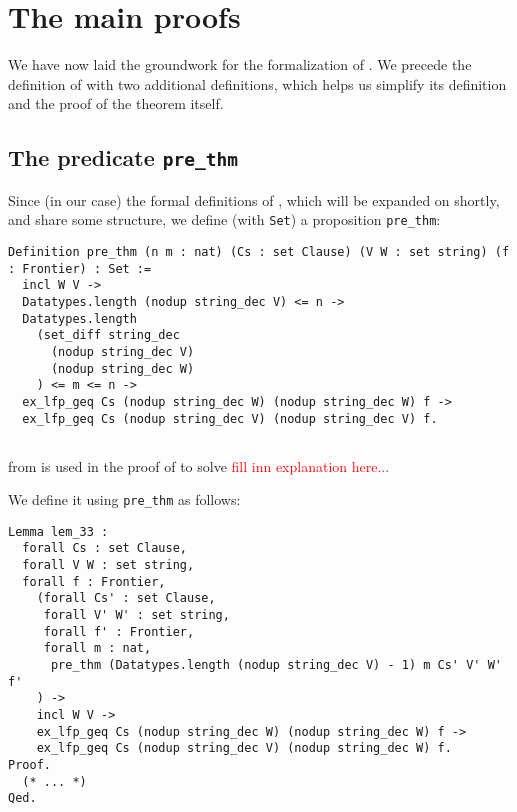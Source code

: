 \section{The main proofs}

We have now laid the groundwork for the formalization of .
We precede the definition of  with two additional definitions, which helps us simplify its
definition and the proof of the theorem itself.

\subsection{The predicate \lstinline{pre_thm}}

Since (in our case) the formal definitions of , which will be expanded on shortly,
and  share some structure, we define (with \lstinline{Set}) a proposition \lstinline{pre_thm}:

\begin{minipage}{\linewidth}
\begin{lstlisting}[language=Coq, label={lst:pre_thm_def}, caption={\lstinline{pre_thm} in Coq}]
Definition pre_thm (n m : nat) (Cs : set Clause) (V W : set string) (f : Frontier) : Set :=
  incl W V ->
  Datatypes.length (nodup string_dec V) <= n ->
  Datatypes.length
    (set_diff string_dec
      (nodup string_dec V)
      (nodup string_dec W)
    ) <= m <= n ->
  ex_lfp_geq Cs (nodup string_dec W) (nodup string_dec W) f ->
  ex_lfp_geq Cs (nodup string_dec V) (nodup string_dec V) f.
\end{lstlisting}
\end{minipage}

\subsection{}

 from \cite{mbezem} is used in the proof of  to solve \textcolor{red}{fill inn explanation here...}

We define it using \lstinline{pre_thm} as follows:

\begin{minipage}{\linewidth}
\begin{lstlisting}[language=Coq, label={lst:lem_33}, caption={\Cref{lem:3.3} in Coq}]
Lemma lem_33 :
  forall Cs : set Clause,
  forall V W : set string,
  forall f : Frontier,
    (forall Cs' : set Clause,
     forall V' W' : set string,
     forall f' : Frontier,
     forall m : nat,
      pre_thm (Datatypes.length (nodup string_dec V) - 1) m Cs' V' W' f'
    ) ->
    incl W V ->
    ex_lfp_geq Cs (nodup string_dec W) (nodup string_dec W) f ->
    ex_lfp_geq Cs (nodup string_dec V) (nodup string_dec W) f.
Proof.
  (* ... *)
Qed.
\end{lstlisting}
\end{minipage}

